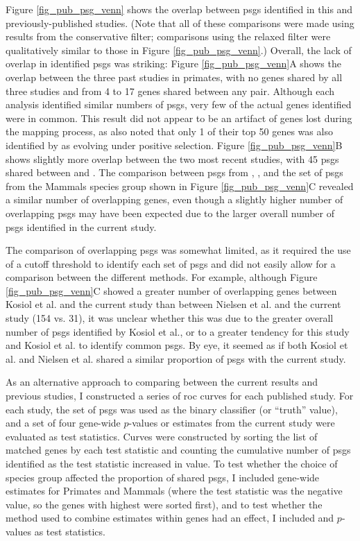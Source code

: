 Figure \ref{fig_pub_psg_venn} shows the overlap between \acp{psg}
identified in this and previously-published studies. (Note that all of
these comparisons were made using results from the conservative
filter; comparisons using the relaxed filter were qualitatively
similar to those in Figure \ref{fig_pub_psg_venn}.) Overall, the lack
of overlap in identified \acp{psg} was striking: Figure
\ref{fig_pub_psg_venn}A shows the overlap between the three past
studies in primates, with no genes shared by all three studies and
from 4 to 17 genes shared between any pair. Although each analysis
identified similar numbers of \acp{psg}, very few of the actual genes
identified were in common. This result did not appear to be an
artifact of genes lost during the mapping process, as
\citet{Nielsen2005} also noted that only 1 of their top 50 genes was
also identified by \citet{Clark2003} as evolving under positive
selection. Figure \ref{fig_pub_psg_venn}B shows slightly more overlap
between the two most recent studies, with 45 \acp{psg} shared between
\citet{Kosiol2008} and \citet{Macaque2007}. The comparison between
\acp{psg} from \citet{Nielsen2005}, \citet{Kosiol2008}, and the set of
\psgeone \acp{psg} from the Mammals species group shown in Figure
\ref{fig_pub_psg_venn}C revealed a similar number of overlapping
genes, even though a slightly higher number of overlapping \acp{psg}
may have been expected due to the larger overall number of \acp{psg}
identified in the current study.

The comparison of overlapping \acp{psg} was somewhat limited, as it
required the use of a cutoff threshold to identify each set of
\acp{psg} and did not easily allow for a comparison between the
different methods. For example, although Figure
\ref{fig_pub_psg_venn}C showed a greater number of overlapping genes
between Kosiol et al. and the current study than between Nielsen et
al. and the current study (154 vs. 31), it was unclear whether this
was due to the greater overall number of \acp{psg} identified by
Kosiol et al., or to a greater tendency for this study and Kosiol et
al. to identify common \acp{psg}. By eye, it seemed as if both Kosiol
et al. and Nielsen et al. shared a similar proportion of \acp{psg}
with the current study.

As an alternative approach to comparing between the current results
and previous studies, I constructed a series of \ac{roc} curves for
each published study. For each study, the set of \acp{psg} was used as
the binary classifier (or ``truth'' value), and a set of four gene-wide
$p$-values or \dnds estimates from the current study were evaluated as
test statistics. Curves were constructed by sorting the list of
matched genes by each test statistic and counting the cumulative
number of \acp{psg} identified as the test statistic increased in
value. To test whether the choice of species group affected the
proportion of shared \acp{psg}, I included gene-wide \dnds estimates
for Primates and Mammals (where the test statistic was the negative
\dnds value, so the genes with highest \dnds were sorted first), and
to test whether the method used to combine \sw estimates within genes
had an effect, I included \psgeone and \psghoch $p$-values as test
statistics.

